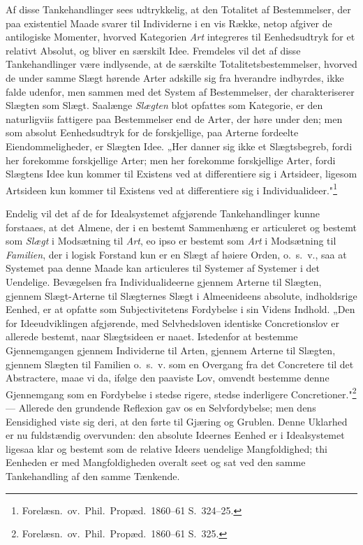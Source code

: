 \documentclass[12pt]{book}
\newcommand{\opage}[1]{\marginnote{\footnotesize\textit{[#1]}}}
\begin{document}
Af disse Tankehandlinger sees udtrykkelig, at den Totalitet af Bestemmelser, der paa existentiel
Maade svarer til Individerne i en vis Række, netop afgiver de antilogiske Momenter, hvorved
Kategorien \emph{Art} integreres til Eenhedsudtryk for et relativt Absolut, og bliver en særskilt
Idee. Fremdeles vil det af disse Tankehandlinger være indlysende, at de særskilte
Totalitetsbestemmelser, hvorved de under samme Slægt hørende Arter adskille sig fra hverandre
indbyrdes, ikke falde udenfor, men sammen med det System af Bestemmelser, der charakteriserer
Slægten som Slægt. Saalænge \emph{Slægten}
\opage{219} blot opfattes som Kategorie, er den naturligviis fattigere paa Bestemmelser end de Arter, der høre
under den; men som absolut Eenhedsudtryk for de forskjellige, paa Arterne fordeelte
Eiendommeligheder, er Slægten Idee. „Her danner sig ikke et Slægtsbegreb, fordi her forekomme
forskjellige Arter; men her forekomme forskjellige Arter, fordi Slægtens Idee kun kommer til
Existens ved at differentiere sig i Artsideer, ligesom Artsideen kun kommer til Existens ved at
differentiere sig i Individualideer."\footnote{Forelæsn.\ ov.\ Phil.\ Propæd.\ 1860--61 S.~324--25.}

Endelig vil det af de for Idealsystemet afgjørende Tankehandlinger kunne forstaaes, at det Almene,
der i en bestemt Sammenhæng er articuleret og bestemt som \emph{Slægt} i Modsætning til \emph{Art},
eo ipso er bestemt som \emph{Art} i Modsætning til \emph{Familien}, der i logisk Forstand kun er en
Slægt af høiere Orden, o.\ s.\ v., saa at Systemet paa denne Maade kan articuleres til Systemer af
Systemer i det Uendelige. Bevægelsen fra Individualideerne gjennem Arterne til Slægten, gjennem
Slægt-Arterne til Slægternes Slægt i Almeenideens absolute, indholdsrige Eenhed, er at opfatte som
Subjectivitetens Fordybelse i sin Videns Indhold. „Den for Ideeudviklingen afgjørende, med
Selvhedsloven identiske Concretionslov er allerede bestemt, naar Slægtsideen er naaet. Istedenfor at
bestemme Gjennemgangen gjennem Individerne til Arten, gjennem Arterne til Slægten, gjennem Slægten
til Familien o.\ s.\ v. som en Overgang fra det Concretere til det Abstractere, maae vi da, ifølge
den paaviste Lov, omvendt bestemme denne Gjennemgang som en Fordybelse i stedse rigere, stedse
inderligere Concretioner."\footnote{Forelæsn.\ ov.\ Phil.\ Propæd.\ 1860--61 S.~325.} --- Allerede
den grundende Reflexion gav os en Selvfordybelse; men dens Eensidighed viste sig deri, at den førte
til Gjæring og Grublen. Denne Uklarhed er nu fuldstændig overvunden:
\opage{220} den absolute Ideernes Eenhed er i Idealsystemet ligesaa klar og bestemt som de relative Ideers
uendelige Mangfoldighed; thi Eenheden er med Mangfoldigheden overalt seet og sat ved den samme
Tankehandling af den samme Tænkende.
\end{document}

